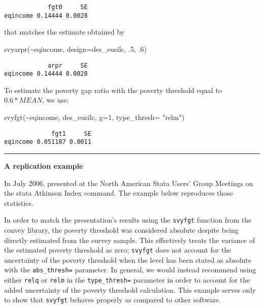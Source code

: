 \documentclass[
]{book}
\newenvironment{Shaded}{\begin{snugshade}}{\end{snugshade}}
\newcommand{\AttributeTok}[1]{\textcolor[rgb]{0.77,0.63,0.00}{#1}}
\newcommand{\DecValTok}[1]{\textcolor[rgb]{0.00,0.00,0.81}{#1}}
\newcommand{\FunctionTok}[1]{\textcolor[rgb]{0.00,0.00,0.00}{#1}}
\newcommand{\NormalTok}[1]{#1}
\newcommand{\SpecialCharTok}[1]{\textcolor[rgb]{0.00,0.00,0.00}{#1}}
\newcommand{\StringTok}[1]{\textcolor[rgb]{0.31,0.60,0.02}{#1}}
\begin{document}
\begin{verbatim}
            fgt0     SE
eqincome 0.14444 0.0028
\end{verbatim}

that matches the estimate obtained by

\begin{Shaded}
\begin{Highlighting}[]
\FunctionTok{svyarpr}\NormalTok{(}\SpecialCharTok{\textasciitilde{}}\NormalTok{eqincome, }\AttributeTok{design=}\NormalTok{des\_eusilc, .}\DecValTok{5}\NormalTok{, .}\DecValTok{6}\NormalTok{)}
\end{Highlighting}
\end{Shaded}

\begin{verbatim}
            arpr     SE
eqincome 0.14444 0.0028
\end{verbatim}

To estimate the poverty gap ratio with the poverty threshold equal to \(0.6*MEAN\), we use:

\begin{Shaded}
\begin{Highlighting}[]
\FunctionTok{svyfgt}\NormalTok{(}\SpecialCharTok{\textasciitilde{}}\NormalTok{eqincome, des\_eusilc, }\AttributeTok{g=}\DecValTok{1}\NormalTok{, }\AttributeTok{type\_thresh=} \StringTok{"relm"}\NormalTok{)}
\end{Highlighting}
\end{Shaded}

\begin{verbatim}
             fgt1     SE
eqincome 0.051187 0.0011
\end{verbatim}

\begin{center}\rule{0.5\linewidth}{0.5pt}\end{center}

\textbf{A replication example}

In July 2006, \textcite{jenkins2006} presented at the North American Stata Users' Group Meetings on the stata Atkinson Index command. The example below reproduces those statistics.

In order to match the presentation's results using the \texttt{svyfgt} function from the convey library, the poverty threshold was considered absolute despite being directly estimated from the survey sample. This effectively treats the variance of the estimated poverty threshold as zero; \texttt{svyfgt} does not account for the uncertainty of the poverty threshold when the level has been stated as absolute with the \texttt{abs\_thresh=} parameter. In general, we would instead recommend using either \texttt{relq} or \texttt{relm} in the \texttt{type\_thresh=} parameter in order to account for the added uncertainty of the poverty threshold calculation. This example serves only to show that \texttt{svyfgt} behaves properly as compared to other software.
\end{document}
